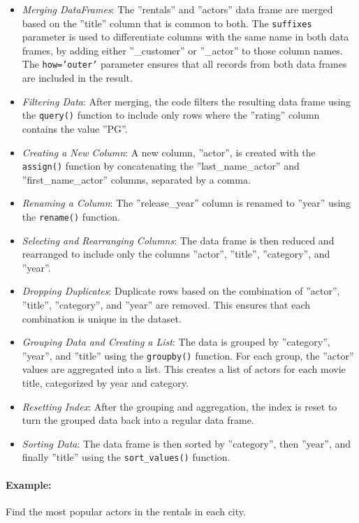 \begin{itemize}

\item \emph{Merging DataFrames}: The ''rentals'' and ''actors'' data frame are merged based on the ''title'' column that is common to both. The \texttt{suffixes} parameter is used to differentiate columns with the same name in both data frames, by adding either ''\_customer'' or ''\_actor'' to those column names. The \texttt{how='outer'} parameter ensures that all records from both data frames are included in the result.
\item \emph{Filtering Data}: After merging, the code filters the resulting data frame using the \texttt{query()} function to include only rows where the ''rating'' column contains the value ''PG''.
\item \emph{Creating a New Column}: A new column, ''actor'', is created with the \texttt{assign()} function by concatenating the ''last\_name\_actor'' and ''first\_name\_actor'' columns, separated by a comma.
\item \emph{Renaming a Column}: The ''release\_year'' column is renamed to ''year'' using the \texttt{rename()} function.
\item \emph{Selecting and Rearranging Columns}: The data frame is then reduced and rearranged to include only the columns ''actor'', ''title'', ''category'', and ''year''.
\item \emph{Dropping Duplicates}: Duplicate rows based on the combination of ''actor'', ''title'', ''category'', and ''year'' are removed. This ensures that each combination is unique in the dataset.
\item \emph{Grouping Data and Creating a List}: The data is grouped by ''category'', ''year'', and ''title'' using the \texttt{groupby()} function. For each group, the ''actor'' values are aggregated into a list. This creates a list of actors for each movie title, categorized by year and category.
\item \emph{Resetting Index}: After the grouping and aggregation, the index is reset to turn the grouped data back into a regular data frame.
\item \emph{Sorting Data}: The data frame is then sorted by ''category'', then ''year'', and finally ''title'' using the \texttt{sort\_values()} function.
\end{itemize}

\paragraph*{Example:} Find the most popular actors in the rentals in each city.

